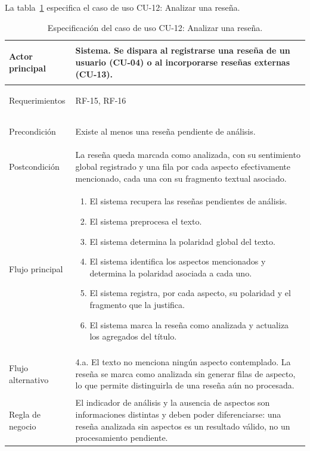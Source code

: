 La tabla~\ref{tab:cu12} especifica el caso de uso CU-12: Analizar una reseña.

\begin{longtable}{|>{\bfseries\raggedright\arraybackslash}p{2.8cm}|>{\raggedright\arraybackslash}p{10cm}|}
	\caption{Especificación del caso de uso CU-12: Analizar una reseña.}\label{tab:cu12} \\
	\hline
	\endfirsthead
	\hline
	\endfoot
	\hline
	\endlastfoot
	Actor principal & Sistema. Se dispara al registrarse una reseña de un usuario (CU-04) o al incorporarse reseñas externas (CU-13). \\
	\hline
	Requerimientos & RF-15, RF-16 \\
	\hline
	Precondición & Existe al menos una reseña pendiente de análisis. \\
	\hline
	Postcondición & La reseña queda marcada como analizada, con su sentimiento global registrado y una fila por cada aspecto efectivamente mencionado, cada una con su fragmento textual asociado. \\
	\hline
	Flujo principal &
	\begin{enumerate}[leftmargin=1.1em, itemsep=2pt, topsep=2pt]
		\item El sistema recupera las reseñas pendientes de análisis.
		\item El sistema preprocesa el texto.
		\item El sistema determina la polaridad global del texto.
		\item El sistema identifica los aspectos mencionados y determina la polaridad asociada a cada uno.
		\item El sistema registra, por cada aspecto, su polaridad y el fragmento que la justifica.
		\item El sistema marca la reseña como analizada y actualiza los agregados del título.
	\end{enumerate} \\
	\hline
	Flujo alternativo & 4.a. El texto no menciona ningún aspecto contemplado. La reseña se marca como analizada sin generar filas de aspecto, lo que permite distinguirla de una reseña aún no procesada. \\
	\hline
	Regla de negocio & El indicador de análisis y la ausencia de aspectos son informaciones distintas y deben poder diferenciarse: una reseña analizada sin aspectos es un resultado válido, no un procesamiento pendiente. \\
\end{longtable}

